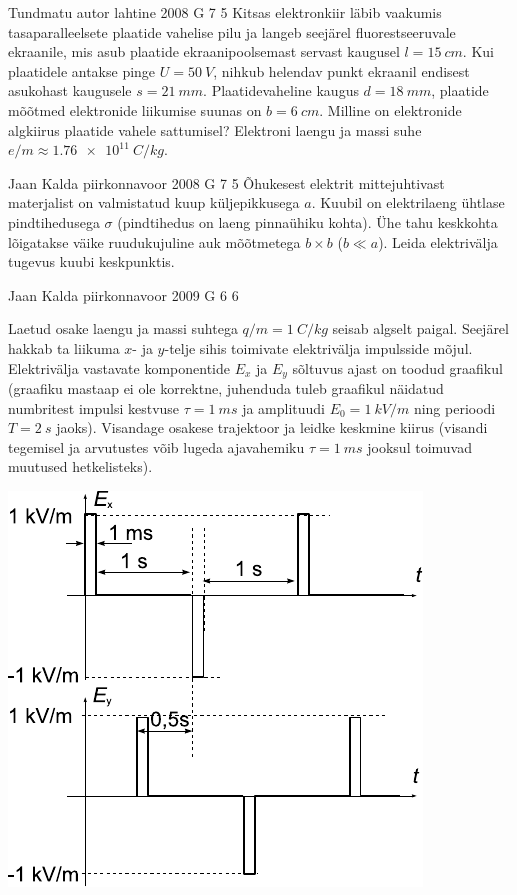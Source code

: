\documentclass[11pt]{article}
\begin{document}
{%
{Tundmatu autor} %
{lahtine} %
{2008} %
{G 7} %
{5} %
{
\ifStatement
Kitsas elektronkiir läbib vaakumis tasaparalleelsete plaatide vahelise pilu ja langeb seejärel fluorestseeruvale ekraanile, mis asub plaatide ekraanipoolsemast servast kaugusel $l = \SI{15}{cm}$. Kui plaatidele antakse pinge $U = \SI{50}{V}$, nihkub helendav punkt ekraanil endisest asukohast kaugusele $s = \SI{21}{mm}$. Plaatidevaheline kaugus $d = \SI{18}{mm}$, plaatide mõõtmed elektronide liikumise suunas on $b = \SI{6}{cm}$. Milline on elektronide algkiirus plaatide vahele sattumisel? Elektroni laengu ja massi suhe $e/m \approx \SI{1,76e11}{C/kg}$.
\fi
}

{Jaan Kalda} %
{piirkonnavoor} %
{2008} %
{G 7} %
{5} %
{
\ifStatement
Õhukesest elektrit mittejuhtivast materjalist on valmistatud kuup küljepikkusega $a$. Kuubil on elektrilaeng ühtlase pindtihedusega $\sigma$ (pindtihedus on laeng pinnaühiku kohta). Ühe tahu keskkohta lõigatakse väike ruudukujuline auk mõõtmetega $b \times b$ ($b \ll a$). Leida elektrivälja tugevus kuubi keskpunktis.
\fi
}

{Jaan Kalda} %
{piirkonnavoor} %
{2009} %
{G 6} %
{6} %
{
\ifStatement
Laetud osake laengu ja massi suhtega $q/m = \SI{1}{C/kg}$ seisab algselt paigal. Seejärel hakkab ta liikuma $x$- ja $y$-telje sihis
toimivate elektrivälja impulsside mõjul. Elektrivälja vastavate komponentide $E_x$ ja $E_y$ sõltuvus ajast on toodud graafikul (graafiku mastaap
ei ole korrektne, juhenduda tuleb graafikul näidatud numbritest impulsi
kestvuse $\tau = \SI{1}{ms}$ ja amplituudi $E_0 = \SI{1}{kV/m}$ ning perioodi $T = \SI{2}{s}$
jaoks). Visandage osakese trajektoor ja leidke keskmine kiirus (visandi tegemisel ja arvutustes võib lugeda ajavahemiku $\tau = \SI{1}{ms}$ jooksul
toimuvad muutused hetkelisteks). 

\begin{center}
	\includegraphics[width=0.6\linewidth]{2009-v2g-06-yl}
\end{center}
\fi
}

}
\end{document}
